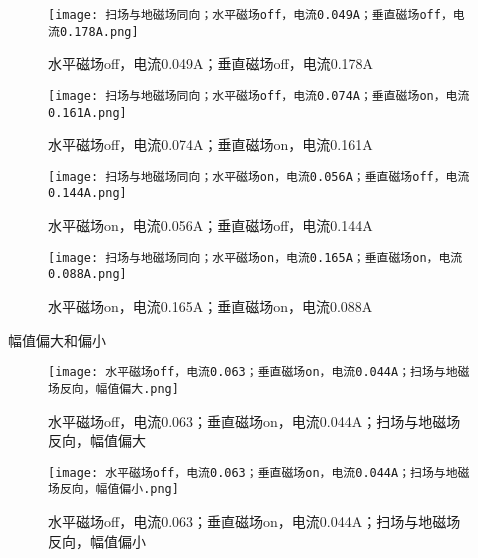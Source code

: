 \begin{figure}[H]
    \centering
    \begin{minipage}{0.45\textwidth}
        \texttt{[image: 扫场与地磁场同向；水平磁场off，电流0.049A；垂直磁场off，电流0.178A.png]}
        \caption{水平磁场off，电流0.049A；垂直磁场off，电流0.178A}
        \label{fig:img5}
    \end{minipage}%
         \hfill
    \begin{minipage}{0.45\textwidth}
        \texttt{[image: 扫场与地磁场同向；水平磁场off，电流0.074A；垂直磁场on，电流0.161A.png]}
        \caption{水平磁场off，电流0.074A；垂直磁场on，电流0.161A}
        \label{fig:img6}
    \end{minipage}
\end{figure}
\begin{figure}[H]
    \centering
    \begin{minipage}{0.45\textwidth}
        \texttt{[image: 扫场与地磁场同向；水平磁场on，电流0.056A；垂直磁场off，电流0.144A.png]}
        \caption{水平磁场on，电流0.056A；垂直磁场off，电流0.144A}
        \label{fig:img7}
    \end{minipage}%
         \hfill
    \begin{minipage}{0.45\textwidth}
        \texttt{[image: 扫场与地磁场同向；水平磁场on，电流0.165A；垂直磁场on，电流0.088A.png]}
        \caption{水平磁场on，电流0.165A；垂直磁场on，电流0.088A}
        \label{fig:img8}
    \end{minipage}
\end{figure}


幅值偏大和偏小



\begin{figure}[H]
    \centering
    \begin{minipage}{0.45\textwidth}
        \texttt{[image: 水平磁场off，电流0.063；垂直磁场on，电流0.044A；扫场与地磁场反向，幅值偏大.png]}
        \caption{水平磁场off，电流0.063；垂直磁场on，电流0.044A；扫场与地磁场反向，幅值偏大}
        \label{fig:img9}
    \end{minipage}%
         \hfill
    \begin{minipage}{0.45\textwidth}
        \texttt{[image: 水平磁场off，电流0.063；垂直磁场on，电流0.044A；扫场与地磁场反向，幅值偏小.png]}
        \caption{水平磁场off，电流0.063；垂直磁场on，电流0.044A；扫场与地磁场反向，幅值偏小}
        \label{fig:img10}
    \end{minipage}
\end{figure}

